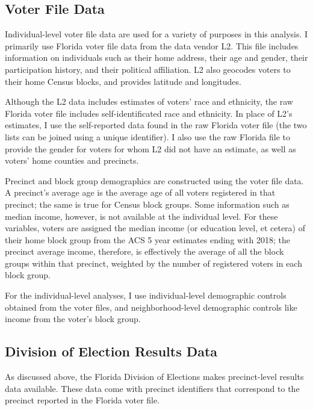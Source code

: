 \documentclass[
  12pt,
]{article}
\begin{document}
\hypertarget{voter-file-data}{%
\subsection*{Voter File Data}\label{voter-file-data}}

Individual-level voter file data are used for a variety of purposes in this analysis. I primarily use Florida voter file data from the data vendor L2. This file includes information on individuals such as their home address, their age and gender, their participation history, and their political affiliation. L2 also geocodes voters to their home Census blocks, and provides latitude and longitudes.

Although the L2 data includes estimates of voters' race and ethnicity, the raw Florida voter file includes self-identificated race and ethnicity. In place of L2's estimates, I use the self-reported data found in the raw Florida voter file (the two lists can be joined using a unique identifier). I also use the raw Florida file to provide the gender for voters for whom L2 did not have an estimate, as well as voters' home counties and precincts.

Precinct and block group demographics are constructed using the voter file data. A precinct's average age is the average age of all voters registered in that precinct; the same is true for Census block groups. Some information such as median income, however, is not available at the individual level. For these variables, voters are assigned the median income (or education level, et cetera) of their home block group from the ACS 5 year estimates ending with 2018; the precinct average income, therefore, is effectively the average of all the block groups within that precinct, weighted by the number of registered voters in each block group.

For the individual-level analyses, I use individual-level demographic controls obtained from the voter files, and neighborhood-level demographic controls like income from the voter's block group.

\hypertarget{division-of-election-results-data}{%
\subsection*{Division of Election Results Data}\label{division-of-election-results-data}}

As discussed above, the Florida Division of Elections makes precinct-level results data available. These data come with precinct identifiers that correspond to the precinct reported in the Florida voter file.
\end{document}
